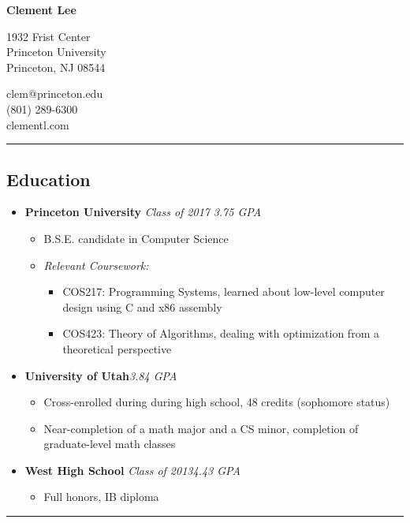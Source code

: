 \documentclass[11pt]{article}
\begin{document}
\begin{center}
{\LARGE {\textbf{Clement Lee}}}

\begin{multicols}{2}
\begin{flushright}
1932 Frist Center\\
Princeton University\\
Princeton, NJ 08544
\end{flushright}
\begin{flushleft}
clem@princeton.edu\\
(801) 289-6300\\
clementl.com
\end{flushleft}
\end{multicols}
\end{center}

\hrule
\vspace{-1em}
\subsection*{\textbf{Education}}
\begin{itemize}[nolistsep,topsep=0pt, label=]
\itemsep0.33em

\item \textbf{Princeton University} \emph{Class of 2017} \hfill \emph{3.75 GPA}
\begin{itemize}[nolistsep,topsep=0pt, label=]
\item B.S.E. candidate in Computer Science
\item \emph{Relevant Coursework:}
\begin{itemize}[nolistsep,topsep=0pt, label=]
\item {COS217:} Programming Systems, learned about low-level computer design using C and x86 assembly
\item {COS423:} Theory of Algorithms, dealing with optimization from a theoretical perspective
\end{itemize}
\end{itemize}

\item \textbf{University of Utah}\hfill \emph{3.84 GPA}
\begin{itemize}[nolistsep,topsep=0pt, label=]
\item Cross-enrolled during during high school, 48 credits (sophomore status)
\item Near-completion of a math major and a CS minor, completion of graduate-level math classes
\end{itemize}

\item \textbf{West High School} \emph{Class of 2013}\hfill \emph{4.43 GPA}
\begin{itemize}[nolistsep,topsep=0pt, label=]
\item Full honors, IB diploma
\end{itemize}
\end{itemize}
\vspace{0.4em}
\hrule
\vspace{-1em}
\end{document}
